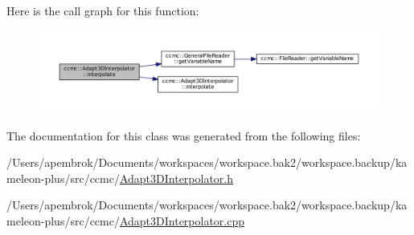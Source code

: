 Here is the call graph for this function\-:\nopagebreak
\begin{figure}[H]
\begin{center}
\leavevmode
\includegraphics[width=350pt]{classccmc_1_1_adapt3_d_interpolator_a62f9740d20678b993f2871c6505f7df3_cgraph}
\end{center}
\end{figure}




The documentation for this class was generated from the following files\-:\begin{DoxyCompactItemize}
\item 
/\-Users/apembrok/\-Documents/workspaces/workspace.\-bak2/workspace.\-backup/kameleon-\/plus/src/ccmc/\hyperlink{_adapt3_d_interpolator_8h}{Adapt3\-D\-Interpolator.\-h}\item 
/\-Users/apembrok/\-Documents/workspaces/workspace.\-bak2/workspace.\-backup/kameleon-\/plus/src/ccmc/\hyperlink{_adapt3_d_interpolator_8cpp}{Adapt3\-D\-Interpolator.\-cpp}\end{DoxyCompactItemize}
